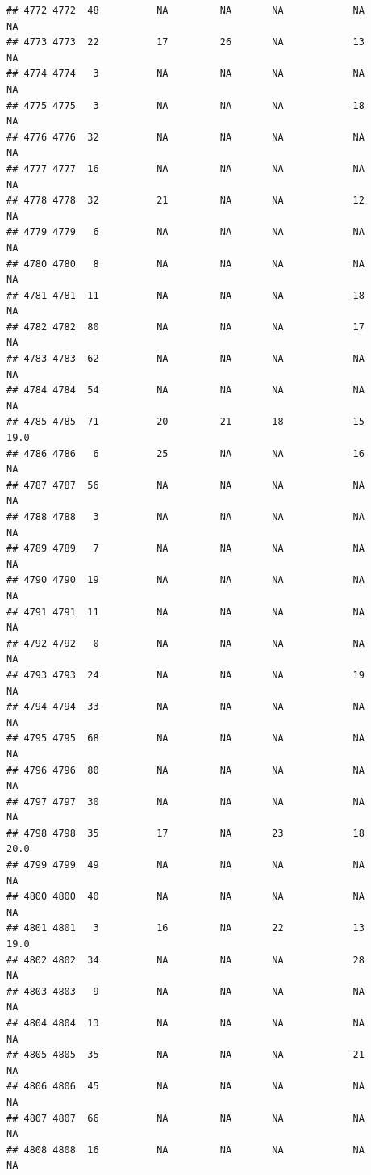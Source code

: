 \documentclass[man]{apa6}
\begin{document}
\begin{verbatim}
## 4772 4772  48          NA         NA       NA            NA       NA
## 4773 4773  22          17         26       NA            13       NA
## 4774 4774   3          NA         NA       NA            NA       NA
## 4775 4775   3          NA         NA       NA            18       NA
## 4776 4776  32          NA         NA       NA            NA       NA
## 4777 4777  16          NA         NA       NA            NA       NA
## 4778 4778  32          21         NA       NA            12       NA
## 4779 4779   6          NA         NA       NA            NA       NA
## 4780 4780   8          NA         NA       NA            NA       NA
## 4781 4781  11          NA         NA       NA            18       NA
## 4782 4782  80          NA         NA       NA            17       NA
## 4783 4783  62          NA         NA       NA            NA       NA
## 4784 4784  54          NA         NA       NA            NA       NA
## 4785 4785  71          20         21       18            15     19.0
## 4786 4786   6          25         NA       NA            16       NA
## 4787 4787  56          NA         NA       NA            NA       NA
## 4788 4788   3          NA         NA       NA            NA       NA
## 4789 4789   7          NA         NA       NA            NA       NA
## 4790 4790  19          NA         NA       NA            NA       NA
## 4791 4791  11          NA         NA       NA            NA       NA
## 4792 4792   0          NA         NA       NA            NA       NA
## 4793 4793  24          NA         NA       NA            19       NA
## 4794 4794  33          NA         NA       NA            NA       NA
## 4795 4795  68          NA         NA       NA            NA       NA
## 4796 4796  80          NA         NA       NA            NA       NA
## 4797 4797  30          NA         NA       NA            NA       NA
## 4798 4798  35          17         NA       23            18     20.0
## 4799 4799  49          NA         NA       NA            NA       NA
## 4800 4800  40          NA         NA       NA            NA       NA
## 4801 4801   3          16         NA       22            13     19.0
## 4802 4802  34          NA         NA       NA            28       NA
## 4803 4803   9          NA         NA       NA            NA       NA
## 4804 4804  13          NA         NA       NA            NA       NA
## 4805 4805  35          NA         NA       NA            21       NA
## 4806 4806  45          NA         NA       NA            NA       NA
## 4807 4807  66          NA         NA       NA            NA       NA
## 4808 4808  16          NA         NA       NA            NA       NA

\end{verbatim}
\end{document}
